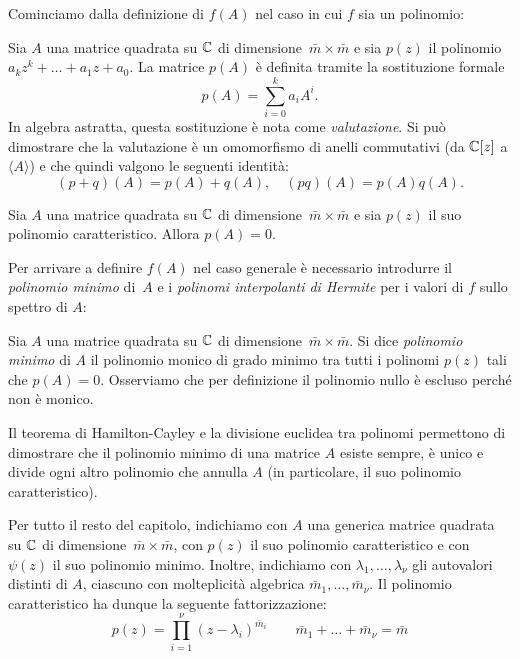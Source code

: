 Cominciamo dalla definizione di $f(A)$ nel caso in cui $f$
sia un polinomio:

\begin{defi}
Sia $A$ una matrice quadrata su $\mathbb{C}$ di dimensione~$\bar{m}\times\bar{m}$
e sia $p(z)$ il polinomio $a_k z^k + \dots + a_1 z + a_0$.
La matrice $p(A)$ è definita tramite la sostituzione formale
\[
p(A) = \sum_{i=0}^k a_i A^i.
\]
In algebra astratta, questa sostituzione è nota come \emph{valutazione}.
Si può dimostrare che la valutazione è un omomorfismo di anelli commutativi
(da $\mathbb{C}[z]$ a $\langle A \rangle$) e che quindi valgono le seguenti identità:
\[
(p+q)(A) = p(A) + q(A),
\quad (pq)(A) = p(A)q(A).
\]
\end{defi}

\begin{teor}
Sia $A$ una matrice quadrata su $\mathbb{C}$ di dimensione~$\bar{m}\times\bar{m}$
e sia $p(z)$ il suo polinomio caratteristico. Allora $p(A) = 0$.
\end{teor}

Per arrivare a definire $f(A)$ nel caso generale è necessario introdurre
il \emph{polinomio minimo} di~$A$ e i \emph{polinomi interpolanti di Hermite}
per i valori di $f$ sullo spettro di $A$:

\begin{defi}
Sia $A$ una matrice quadrata su $\mathbb{C}$ di dimensione~$\bar{m}\times\bar{m}$.
Si dice \emph{polinomio minimo} di $A$ il polinomio monico di grado
minimo tra tutti i polinomi $p(z)$ tali che $p(A) = 0$.
Osserviamo che per definizione il polinomio nullo è escluso perché
non è monico.
\end{defi}

\noindent Il teorema di Hamilton-Cayley e la divisione euclidea tra polinomi
permettono di dimostrare che il polinomio minimo di una matrice $A$
esiste sempre, è unico e divide ogni altro polinomio che annulla $A$
(in particolare, il suo polinomio caratteristico).

Per tutto il resto del capitolo, indichiamo con $A$ una generica matrice
quadrata su $\mathbb{C}$ di dimensione~$\bar{m}\times\bar{m}$, con $p(z)$
il suo polinomio caratteristico e con $\psi(z)$ il suo polinomio minimo.
Inoltre, indichiamo con $\lambda_1,\dots,\lambda_\nu$ gli autovalori
distinti di $A$, ciascuno con molteplicità algebrica
$\bar{m}_1,\dots,\bar{m}_\nu$.
Il polinomio caratteristico ha dunque la seguente fattorizzazione:
\[
p(z) = \prod_{i=1}^{\nu} (z-\lambda_i)^{\bar{m}_i}
\qquad \bar{m}_1 + \dots + \bar{m}_\nu = \bar{m}
\]

